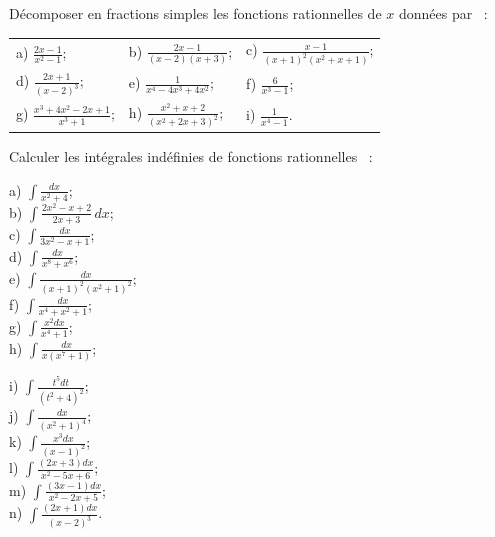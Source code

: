 \documentclass[12pt,french,oneside,a4paper]{memoir} %
\begin{document}
\begin{exo}
Décomposer en fractions simples les fonctions rationnelles
de $x$ données par ~:\\

\begin{tabular}{lll}
a) $\displaystyle{\frac{2x-1}{x^2-1}}$;\quad&\quad
b) $\displaystyle{\frac{2x-1}{(x-2)(x+3)}}$;\quad&\quad
c) $\displaystyle{\frac{x-1}{(x+1)^2(x^2+x+1)}}$;\\[4mm]
d) $\displaystyle{\frac{2x+1}{(x-2)^3}}$;\quad&\quad
e) $\displaystyle{\frac{1}{x^4-4x^3+4x^2}}$;\quad&\quad
f) $\displaystyle{\frac{6}{x^3-1}}$;\\[4mm]
g) $\displaystyle{\frac{x^3+4x^2-2x+1}{x^3+1}}$;\quad&\quad
h) $\displaystyle{\frac{x^2+x+2}{(x^2+2x+3)^2}}$;\quad&\quad
i) $\displaystyle{\frac{1}{x^4-1}}$.
\end{tabular}
\end{exo}
\begin{exo}
Calculer les intégrales indéfinies de fonctions
rationnelles ~:\\

\hfill
\begin{minipage}[t]{6cm}
a) $\displaystyle{\int \frac{dx}{x^2+4}}$;\\[2mm]
b) $\displaystyle{\int \frac{2x^2-x+2}{2x+3}\,dx}$;\\[2mm]
c) $\displaystyle{\int \frac{dx}{3x^2-x+1}}$;\\[2mm]
d) $\displaystyle{\int \frac{dx}{x^8+x^6}}$;\\[2mm]
e) $\displaystyle{\int \frac{dx}{(x+1)^2(x^2+1)^2}}$;\\[2mm]
f) $\displaystyle{\int \frac{dx}{x^4+x^2+1}}$;\\[2mm]
g) $\displaystyle{\int \frac{x^2dx}{x^4+1}}$;\\[2mm]
h) $\displaystyle{\int \frac{dx}{x(x^7+1)}}$;
\end{minipage}
\hfill
\begin{minipage}[t]{8cm}
i) $\displaystyle{\int \frac{t^5dt}{(t^2+4)^2}}$;\\[2mm]
j) $\displaystyle{\int \frac{dx}{(x^2+1)^4}}$;\\[2mm]
k) $\displaystyle{\int \frac{x^3dx}{(x-1)^2}}$;\\[2mm]
l) $\displaystyle{\int \frac{(2x+3)dx}{x^2-5x+6}}$;\\[2mm]
m) $\displaystyle{\int \frac{(3x-1)dx}{x^2-2x+5}}$;\\[2mm]
n) $\displaystyle{\int \frac{(2x+1)dx}{(x-2)^3}}$.
\end{minipage} \hfill
\end{exo}
\end{document}
